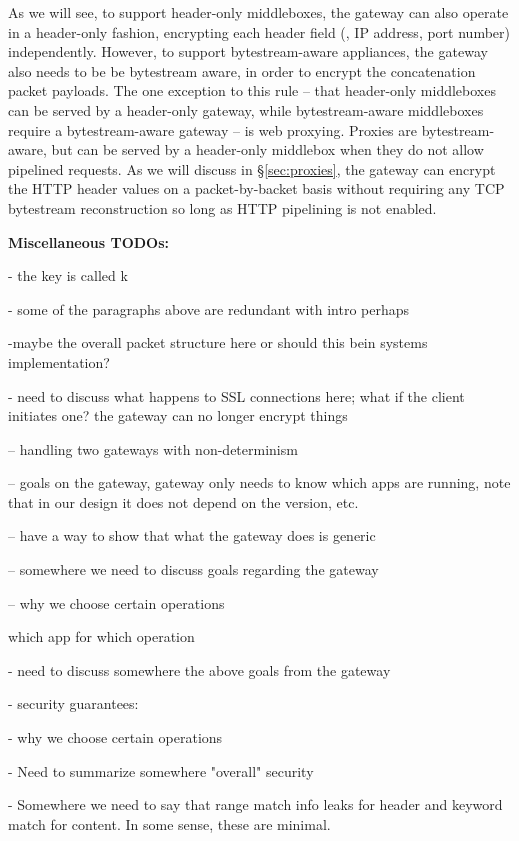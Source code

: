   As we will see, to support header-only middleboxes, the \sys gateway can also operate in a header-only fashion, encrypting each header field (\eg{}, IP address, port number) independently.
  However, to support bytestream-aware appliances, the \sys gateway also needs to be be bytestream aware, in order to encrypt the concatenation packet payloads.
  The one exception to this rule -- that header-only middleboxes can be served by a header-only gateway, while bytestream-aware middleboxes require a bytestream-aware gateway -- is web proxying.
  Proxies are bytestream-aware, but can be served by a header-only middlebox when they do not allow pipelined requests.
  As we will discuss in \S\ref{sec:proxies}, the gateway can encrypt the HTTP header values on a packet-by-backet basis without requiring any TCP bytestream reconstruction so long as HTTP pipelining is not enabled. 


{\bf Miscellaneous TODOs:}

- the key is called k

- some of the paragraphs above are redundant with intro perhaps

-maybe the overall packet structure here or should this bein systems implementation? 

- need to discuss what happens to SSL connections here; what if the client initiates one? the gateway can no longer
encrypt things

-- handling two gateways with non-determinism

-- goals on the gateway, gateway only needs to know which apps are running, note that in our design
it does not depend on the version, etc. 

-- have a way to show that what the gateway does is generic 
   
-- somewhere we need to discuss goals regarding the gateway

-- why we choose certain operations

which app for which operation


- need to discuss somewhere the above goals from the gateway

- security guarantees:

- why we choose certain operations

- Need to summarize somewhere "overall" security

- Somewhere we need to say that range match info leaks for header and keyword match for content. In some sense, these are minimal. 

